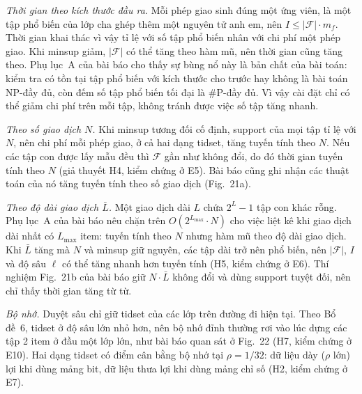 \emph{Thời gian theo kích thước đầu ra.} Mỗi phép giao sinh đúng một ứng viên, là một tập phổ biến của lớp cha ghép thêm một nguyên tử anh em, nên $I \le |\mathcal{F}| \cdot m_f$. Thời gian khai thác vì vậy tỉ lệ với số tập phổ biến nhân với chi phí một phép giao. Khi minsup giảm, $|\mathcal{F}|$ có thể tăng theo hàm mũ, nên thời gian cũng tăng theo. Phụ lục~A của bài báo cho thấy sự bùng nổ này là bản chất của bài toán: kiểm tra có tồn tại tập phổ biến với kích thước cho trước hay không là bài toán NP-đầy đủ, còn đếm số tập phổ biến tối đại là \#P-đầy đủ. Vì vậy cài đặt chỉ có thể giảm chi phí trên mỗi tập, không tránh được việc số tập tăng nhanh.

\emph{Theo số giao dịch $N$.} Khi minsup tương đối cố định, support của mọi tập tỉ lệ với $N$, nên chi phí mỗi phép giao, ở cả hai dạng tidset, tăng tuyến tính theo $N$. Nếu các tập con được lấy mẫu đều thì $\mathcal{F}$ gần như không đổi, do đó thời gian tuyến tính theo $N$ (giả thuyết H4, kiểm chứng ở E5). Bài báo cũng ghi nhận các thuật toán của nó tăng tuyến tính theo số giao dịch (Fig.~21a).

\emph{Theo độ dài giao dịch $\bar{L}$.} Một giao dịch dài $L$ chứa $2^L - 1$ tập con khác rỗng. Phụ lục~A của bài báo nêu chặn trên $O(2^{L_{\max}} \cdot N)$ cho việc liệt kê khi giao dịch dài nhất có $L_{\max}$ item: tuyến tính theo $N$ nhưng hàm mũ theo độ dài giao dịch. Khi $\bar{L}$ tăng mà $N$ và minsup giữ nguyên, các tập dài trở nên phổ biến, nên $|\mathcal{F}|$, $I$ và độ sâu $\ell$ có thể tăng nhanh hơn tuyến tính (H5, kiểm chứng ở E6). Thí nghiệm Fig.~21b của bài báo giữ $N \cdot \bar{L}$ không đổi và dùng support tuyệt đối, nên chỉ thấy thời gian tăng từ từ.

\emph{Bộ nhớ.} Duyệt sâu chỉ giữ tidset của các lớp trên đường đi hiện tại. Theo Bổ đề~6, tidset ở độ sâu lớn nhỏ hơn, nên bộ nhớ đỉnh thường rơi vào lúc dựng các tập 2 item ở đầu một lớp lớn, như bài báo quan sát ở Fig.~22 (H7, kiểm chứng ở E10). Hai dạng tidset có điểm cân bằng bộ nhớ tại $\rho = 1/32$: dữ liệu dày ($\rho$ lớn) lợi khi dùng mảng bit, dữ liệu thưa lợi khi dùng mảng chỉ số (H2, kiểm chứng ở E7).
